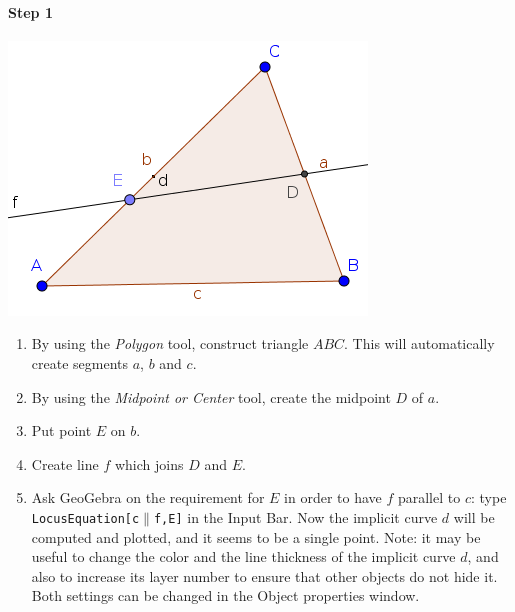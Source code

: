 \documentclass{article}
\begin{document}
\paragraph{Step 1}
\begin{center}
\includegraphics[scale=0.5]{classroom1}
\end{center}
\begin{enumerate}
    \item By using the \textit{Polygon} tool, construct triangle $ABC$. This will automatically create segments $a$, $b$ and $c$.
    \item By using the \textit{Midpoint or Center} tool, create the midpoint $D$ of $a$.
    \item Put point $E$ on $b$.
    \item Create line $f$ which joins $D$ and $E$.
    \item Ask GeoGebra on the requirement for $E$ in order to have $f$ parallel to $c$: type \texttt{LocusEquation[c$\parallel$f,E]} in the Input Bar. Now the implicit curve $d$ will be computed and plotted, and it seems to be a single point. Note: it may be useful to change the color and the line thickness of the implicit curve $d$, and also to increase its layer number to ensure that other objects do not hide it. Both settings can be changed in the Object properties window.
\end{enumerate}
\end{document}
